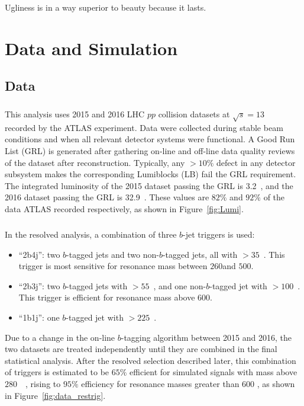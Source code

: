 \begin{savequote}[75mm]
Ugliness is in a way superior to beauty because it lasts.
\end{savequote}
\chapter{Data and Simulation}
%

\section{Data}
\label{sec:data}
\paragraph{}
This analysis uses 2015 and 2016 LHC $pp$ collision datasets at $\sqrt{s} = 13$~\TeV~ recorded by the ATLAS experiment. Data were collected during stable beam conditions and when all relevant detector systems were functional. A Good Run List (GRL) is generated after gathering on-line and off-line data quality reviews of the dataset after reconstruction. Typically, any $> 10\%$ defect in any detector subsystem makes the corresponding Lumiblocks (LB) fail the GRL requirement. The integrated luminosity of the 2015 dataset passing the GRL is 3.2~\ifb, and the 2016 dataset passing the GRL is 32.9~\ifb. These values are $82\%$ and $92\%$ of the data ATLAS recorded respectively, as shown in Figure~\ref{fig:Lumi}.

\paragraph{}
In the resolved analysis, a combination of three $b$-jet triggers is used:
\begin{itemize}
	\item ``2b4j'': two $b$-tagged jets and two non-$b$-tagged jets, all with \pt$>35$~\GeV. This trigger is most sensitive for resonance mass between $260$\GeV and $500$\GeV.
	\item ``2b3j'': two $b$-tagged jets with \pt$>55$~\GeV, and one non-$b$-tagged jet with \pt$>100$~\GeV. This trigger is efficient for resonance mass above $600$\GeV.
	\item ``1b1j'': one $b$-tagged jet with \pt$>225$~\GeV.
\end{itemize}
Due to a change in the on-line $b$-tagging algorithm between 2015 and 2016, the two datasets are treated independently until they are combined in the final statistical analysis. 
After the resolved selection described later, this combination of triggers is estimated to be $65\%$ efficient for simulated signals with mass above $280$~\GeV~, rising to $95\%$ efficiency for resonance masses greater than $600$ \GeV, as shown in Figure~\ref{fig:data_restrig}.

